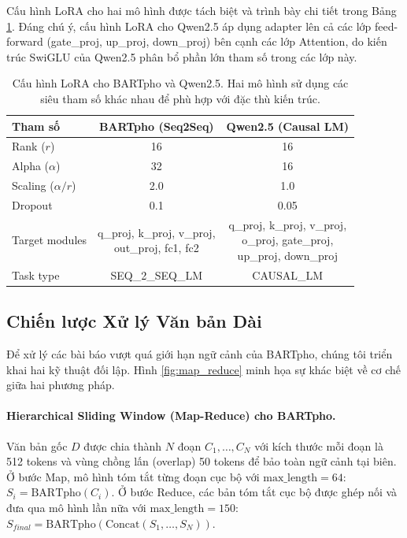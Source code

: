 \documentclass{article}
\begin{document}
Cấu hình LoRA cho hai mô hình được tách biệt và trình bày chi tiết trong Bảng \ref{tab:lora_config}. Đáng chú ý, cấu hình LoRA cho Qwen2.5 áp dụng adapter lên cả các lớp feed-forward (gate\_proj, up\_proj, down\_proj) bên cạnh các lớp Attention, do kiến trúc SwiGLU của Qwen2.5 phân bổ phần lớn tham số trong các lớp này.

\begin{table}[H]
\centering
\caption{Cấu hình LoRA cho BARTpho và Qwen2.5. Hai mô hình sử dụng các siêu tham số khác nhau để phù hợp với đặc thù kiến trúc.}
\label{tab:lora_config}
\begin{tabular}{@{}lcc@{}}
\toprule
\textbf{Tham số} & \textbf{BARTpho (Seq2Seq)} & \textbf{Qwen2.5 (Causal LM)} \\
\midrule
Rank ($r$)          & 16  & 16 \\
Alpha ($\alpha$)    & 32  & 16 \\
Scaling ($\alpha/r$) & 2.0 & 1.0 \\
Dropout             & 0.1 & 0.05 \\
Target modules      & \makecell{q\_proj, k\_proj, v\_proj,\\out\_proj, fc1, fc2} & \makecell{q\_proj, k\_proj, v\_proj,\\o\_proj, gate\_proj,\\up\_proj, down\_proj} \\
Task type           & SEQ\_2\_SEQ\_LM & CAUSAL\_LM \\
\bottomrule
\end{tabular}
\end{table}

\subsection{Chiến lược Xử lý Văn bản Dài}

Để xử lý các bài báo vượt quá giới hạn ngữ cảnh của BARTpho, chúng tôi triển khai hai kỹ thuật đối lập. Hình \ref{fig:map_reduce} minh họa sự khác biệt về cơ chế giữa hai phương pháp.

\paragraph{Hierarchical Sliding Window (Map-Reduce) cho BARTpho.}
Văn bản gốc $D$ được chia thành $N$ đoạn $C_1, \dots, C_N$ với kích thước mỗi đoạn là 512 tokens và vùng chồng lấn (overlap) 50 tokens để bảo toàn ngữ cảnh tại biên. Ở bước Map, mô hình tóm tắt từng đoạn cục bộ với $\text{max\_length} = 64$: $S_i = \text{BARTpho}(C_i)$. Ở bước Reduce, các bản tóm tắt cục bộ được ghép nối và đưa qua mô hình lần nữa với $\text{max\_length} = 150$: $S_{final} = \text{BARTpho}(\text{Concat}(S_1, \dots, S_N))$.
\end{document}
